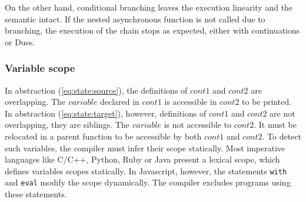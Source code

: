 On the other hand, conditional branching leaves the execution linearity and the semantic intact.
If the nested asynchronous function is not called due to branching, the execution of the chain stops as expected, either with continuations or Dues.


\subsubsection{Variable scope}

In abstraction (\ref{eq:state:source}), the definitions of $cont1$ and $cont2$ are overlapping.
The $variable$ declared in $cont1$ is accessible in $cont2$ to be printed.
In abstraction (\ref{eq:state:target}), however, definitions of $cont1$ and $cont2$ are not overlapping, they are siblings.
The $variable$ is not accessible to $cont2$.
It must be relocated in a parent function to be accessible by both $cont1$ and $cont2$.
To detect such variables, the compiler must infer their scope statically.
Most imperative languages like C/C++, Python, Ruby or Java present a lexical scope, which defines variables scopes statically.
In Javascript, however, the statements \texttt{with} and \texttt{eval} modify the scope dynamically.
The compiler excludes programs using these statements.


